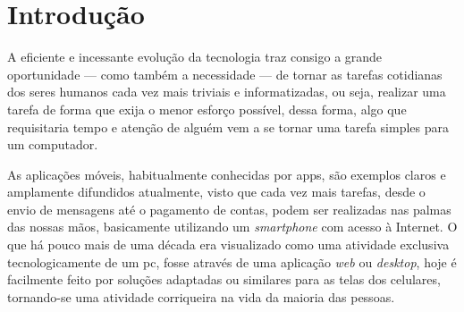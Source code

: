 \chapter{Introdução}
\label{chp:introduction}



A eficiente e incessante evolução da tecnologia traz consigo a grande oportunidade — como também a necessidade — de tornar as tarefas cotidianas dos seres humanos cada vez mais triviais e informatizadas, ou seja, realizar uma tarefa de forma que exija o menor esforço possível, dessa forma, algo que requisitaria tempo e atenção de alguém vem a se tornar uma tarefa simples para um computador.

As aplicações móveis, habitualmente conhecidas por \acp{app}, são exemplos claros e amplamente difundidos atualmente, visto que cada vez mais tarefas, desde o envio de mensagens até o pagamento de contas, podem ser realizadas nas palmas das nossas mãos, basicamente utilizando um \textit{smartphone} com acesso à Internet. O que há pouco mais de uma década era visualizado como uma atividade exclusiva tecnologicamente de um \ac{pc}, fosse através de uma aplicação \textit{web} ou \textit{desktop}, hoje é facilmente feito por soluções adaptadas ou similares para as telas dos celulares, tornando-se uma atividade corriqueira na vida da maioria das pessoas.

